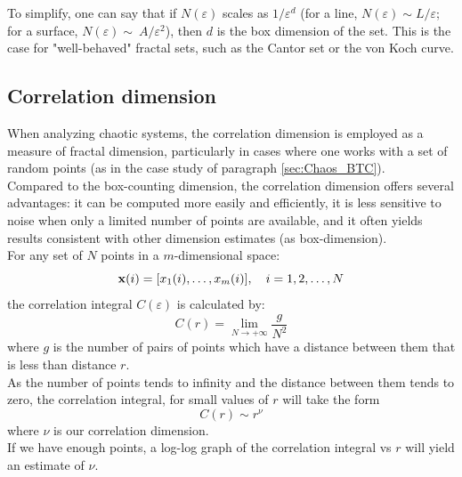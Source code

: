 To simplify, one can say that if $N(\varepsilon)$ scales as $1/\varepsilon^d$ (for a line, $N(\varepsilon) \sim L/\varepsilon$; for a surface, $N(\varepsilon) \sim~A/\varepsilon^2$), then $d$ is the box dimension of the set. This is the case for "well-behaved" fractal sets, such as the Cantor set or the von Koch curve.


\subsection{Correlation dimension} \label{app:C_Correlation_dimension}
When analyzing chaotic systems, the correlation dimension is employed as a measure of fractal dimension, particularly in cases where one works with a set of random points (as in the case study of paragraph \ref{sec:Chaos_BTC}).\\

Compared to the box-counting dimension, the correlation dimension offers several advantages: it can be computed more easily and efficiently, it is less sensitive to noise when only a limited number of points are available, and it often yields results consistent with other dimension estimates (as box-dimension).\\

For any set of $N$ points in a $m$-dimensional space:
\begin{equation*}
    \vb{x}(i)=[x_1(i),\dots,x_m(i)], \quad i=1,2,\dots,N
\end{equation*}
the correlation integral $C(\varepsilon)$ is calculated by:
\begin{equation*}
    C(r)=\lim_{N \to +\infty} \frac{g}{N^2}
\end{equation*}
where $g$ is the number of pairs of points which have a distance between them that is less than distance $r$.\\
As the number of points tends to infinity and the distance between them tends to zero, the correlation integral, for small values of $r$ will take the form 
\begin{equation*}
    C(r) \sim r^\nu
\end{equation*}
where $\nu$ is our correlation dimension.\\
If we have enough points, a log-log graph of the correlation integral vs $r$ will yield an estimate of $\nu$.